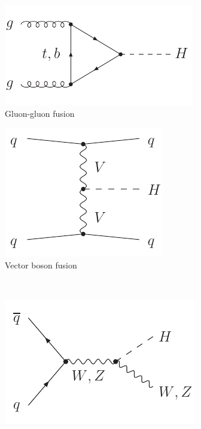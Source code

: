 \begin{figure}
	\null\hfill
	\begin{subfigure}[b]{0.4\textwidth}
		\includegraphics[width=\textwidth]{axodraw/ggF.pdf}
		\caption{Gluon-gluon fusion}
		\label{fig:feyn:ggF}
	\end{subfigure}
	\hfill
	\begin{subfigure}[b]{0.3\textwidth}
		\includegraphics[width=\textwidth]{axodraw/VBF.pdf}
		\caption{Vector boson fusion}
		\label{fig:feyn:VBF}
	\end{subfigure}
	\hfill\null
	\\\bigskip
	\null\hfill
	\begin{subfigure}[b]{0.33\textwidth}
		\includegraphics[width=\textwidth]{axodraw/VH.pdf}

\end{subfigure}
\end{figure}
